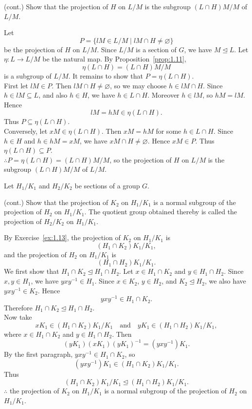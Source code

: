 \documentclass[../Odyssey_Project.tex]{subfiles}
\begin{document}
\begin{exercise}
\label{ex:1.13}
(cont.) Show that the projection of $H$ on $L/M$ is the subgroup $(L \cap H)M/M$ of $L/M$.
\end{exercise}
\begin{solution}
Let
\[
    P = \{lM \in L/M \mid lM \cap H \neq \varnothing\}
\]
be the projection of \(H\) on \(L/M\). Since \(L/M\) is a section of \(G\), we have \(M \trianglelefteq L\). Let \(\eta \colon L \to L/M\) be the natural map. By Proposition~\ref{prop:1.11},
\[
    \eta(L \cap H) = (L \cap H)M/M
\]
is a subgroup of \(L/M\). It remains to show that \(P = \eta(L \cap H)\). \\
First let \(lM \in P\). Then \(lM \cap H \neq \varnothing\), so we may choose \(h \in lM \cap H\). Since \(h \in lM \subseteq L\), and also \(h \in H\), we have \(h \in L \cap H\). Moreover \(h \in lM\), so \(hM=lM\). Hence
\[
    lM = hM \in \eta(L \cap H).
\]
Thus \(P \subseteq \eta(L \cap H)\). \\
Conversely, let \(xM \in \eta(L \cap H)\). Then \(xM=hM\) for some \(h \in L \cap H\). Since \(h \in H\) and \(h \in hM=xM\), we have \(xM \cap H \neq \varnothing\). Hence \(xM \in P\). Thus \(\eta(L \cap H) \subseteq P\). \\
\(\therefore P = \eta(L \cap H) = (L \cap H)M/M\), so the projection of \(H\) on \(L/M\) is the subgroup \((L \cap H)M/M\) of \(L/M\).
\end{solution}

\noindent Let $H_1/K_1$ and $H_2/K_2$ be sections of a group $G$.

\begin{exercise}
\label{ex:1.14}
(cont.) Show that the projection of $K_2$ on $H_1/K_1$ is a normal subgroup of the projection of $H_2$ on $H_1/K_1$. The quotient group obtained thereby is called the projection of $H_2/K_2$ on $H_1/K_1$.
\end{exercise}
\begin{solution}
By Exercise~\ref{ex:1.13}, the projection of \(K_2\) on \(H_1/K_1\) is
\[
    (H_1 \cap K_2)K_1/K_1,
\]
and the projection of \(H_2\) on \(H_1/K_1\) is
\[
    (H_1 \cap H_2)K_1/K_1.
\]
We first show that \(H_1 \cap K_2 \trianglelefteq H_1 \cap H_2\). Let \(x \in H_1 \cap K_2\) and \(y \in H_1 \cap H_2\). Since \(x,y \in H_1\), we have \(yxy^{-1} \in H_1\). Since \(x \in K_2\), \(y \in H_2\), and \(K_2 \trianglelefteq H_2\), we also have \(yxy^{-1} \in K_2\). Hence
\[
    yxy^{-1} \in H_1 \cap K_2.
\]
Therefore \(H_1 \cap K_2 \trianglelefteq H_1 \cap H_2\). \\
Now take
\[
    xK_1 \in (H_1 \cap K_2)K_1/K_1
    \quad\text{and}\quad
    yK_1 \in (H_1 \cap H_2)K_1/K_1,
\]
where \(x \in H_1 \cap K_2\) and \(y \in H_1 \cap H_2\). Then
\[
    (yK_1)(xK_1)(yK_1)^{-1}
    = (yxy^{-1})K_1.
\]
By the first paragraph, \(yxy^{-1} \in H_1 \cap K_2\), so
\[
    (yxy^{-1})K_1 \in (H_1 \cap K_2)K_1/K_1.
\]
Thus
\[
    (H_1 \cap K_2)K_1/K_1
    \trianglelefteq
    (H_1 \cap H_2)K_1/K_1.
\]
\(\therefore\) the projection of \(K_2\) on \(H_1/K_1\) is a normal subgroup of the projection of \(H_2\) on \(H_1/K_1\).
\end{solution}
\end{document}
